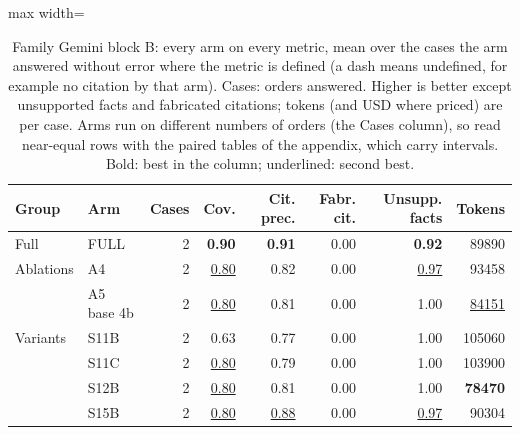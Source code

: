 \begin{table}[t]
\centering\footnotesize
\begin{adjustbox}{max width=\textwidth}
\begin{tabular}{@{}llrrrrrr@{}}
\toprule
Group & Arm & Cases & Cov. & Cit. prec. & Fabr. cit. & Unsupp. facts & Tokens \\
\midrule
Full & FULL & 2 & \textbf{0.90} & \textbf{0.91} & 0.00 & \textbf{0.92} & 89890 \\
\midrule
Ablations & A4 & 2 & \underline{0.80} & 0.82 & 0.00 & \underline{0.97} & 93458 \\
 & A5 base 4b & 2 & \underline{0.80} & 0.81 & 0.00 & 1.00 & \underline{84151} \\
\midrule
Variants & S11B & 2 & 0.63 & 0.77 & 0.00 & 1.00 & 105060 \\
 & S11C & 2 & \underline{0.80} & 0.79 & 0.00 & 1.00 & 103900 \\
 & S12B & 2 & \underline{0.80} & 0.81 & 0.00 & 1.00 & \textbf{78470} \\
 & S15B & 2 & \underline{0.80} & \underline{0.88} & 0.00 & \underline{0.97} & 90304 \\
\bottomrule
\end{tabular}
\end{adjustbox}
\caption{Family Gemini block B: every arm on every metric, mean over the cases the arm answered without error where the metric is defined (a dash means undefined, for example no citation by that arm). Cases: orders answered. Higher is better except unsupported facts and fabricated citations; tokens (and USD where priced) are per case. Arms run on different numbers of orders (the Cases column), so read near-equal rows with the paired tables of the appendix, which carry intervals. Bold: best in the column; underlined: second best.}
\label{tab:master_shravani_gem}
\end{table}